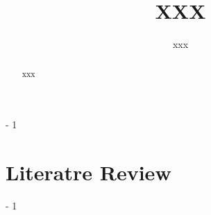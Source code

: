 \documentclass[12pt,letterpaper]{article}
\newcommand{\MyTabs}{ \hspace*{15.mm} \= ... \kill }
\begin{document}
\renewcommand{\refname}{REFERENCES}

\title{XXX}

\author {xxx}%

\date{}

\maketitle

\begin{abstract}
\noindent{}
xxx
\end{abstract}



\looseness - 1




\section*{Literatre Review}
\looseness - 1
\end{document}

